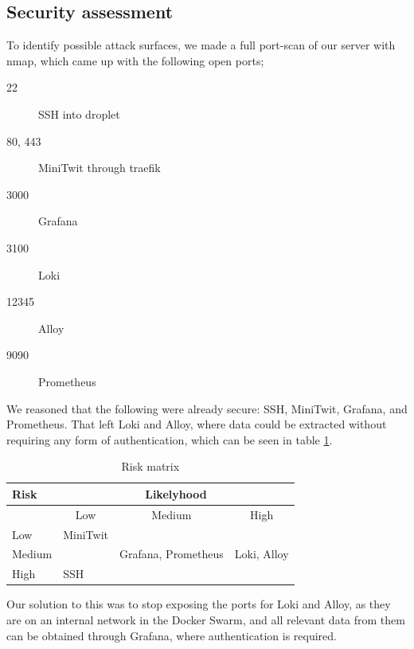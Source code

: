 \subsection{Security assessment} %
To identify possible attack surfaces, we made a full port-scan of our server with nmap, which came up with the following open ports;
\begin{description}
    \item[22] SSH into droplet
    \item[80, 443] MiniTwit through traefik
    \item[3000] Grafana
    \item[3100] Loki
    \item[12345] Alloy
    \item[9090] Prometheus
\end{description}
We reasoned that the following were already secure: SSH, MiniTwit, Grafana, and Prometheus. That left Loki and Alloy, where data could be extracted without requiring any form of authentication, which can be seen in table \ref{tab:risk-matrix}. 
\begin{table}[h!]
\centering
\begin{tabular}{|l|lll|}
\hline
\textbf{Risk}   & \multicolumn{3}{c|}{\textbf{Likelyhood}}                                                                    \\ \hline
       & \multicolumn{1}{c|}{Low}                 & \multicolumn{1}{c|}{Medium} & \multicolumn{1}{c|}{High} \\ \hline
Low    & \multicolumn{1}{l|}{MiniTwit}             & \multicolumn{1}{l|}{}       &                           \\ \hline
Medium & \multicolumn{1}{l|}{} & \multicolumn{1}{l|}{Grafana, Prometheus}       & Loki, Alloy               \\ \hline
High   & \multicolumn{1}{l|}{SSH}                 & \multicolumn{1}{l|}{}       &                           \\ \hline
\end{tabular}
\caption{Risk matrix}
\label{tab:risk-matrix}
\end{table}

Our solution to this was to stop exposing the ports for Loki and Alloy, as they are on an internal network in the Docker Swarm, and all relevant data from them can be obtained through Grafana, where authentication is required.

